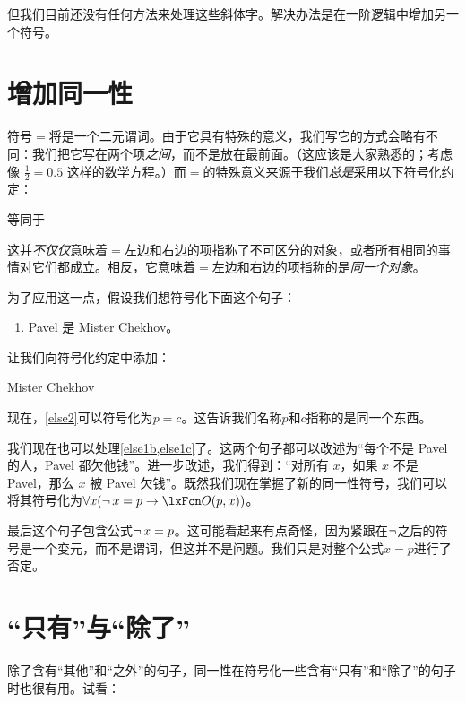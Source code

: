 但我们目前还没有任何方法来处理这些斜体字。解决办法是在一阶逻辑中增加另一个符号。

\section{增加同一性}

符号$=$将是一个二元谓词。由于它具有特殊的意义，我们写它的方式会略有不同：我们把它写在两个项\emph{之间}，而不是放在最前面。（这应该是大家熟悉的；考虑像 $\frac{1}{2} = 0.5$ 这样的数学方程。）而$=$的特殊意义来源于我们\emph{总是}采用以下符号化约定：

\begin{ekey}
		\item[x=y]  等同于 
	\end{ekey}

这并\emph{不仅仅}意味着$=$左边和右边的项指称了不可区分的对象，或者所有相同的事情对它们都成立。相反，它意味着$=$左边和右边的项指称的是\emph{同一个对象}。

为了应用这一点，假设我们想符号化下面这个句子：

\begin{enumerate}
\item\label{else2} Pavel 是 Mister Chekhov。
\end{enumerate}

让我们向符号化约定中添加：

\begin{ekey}
		\item[c] Mister Chekhov
	\end{ekey}

现在，\cref*{else2}可以符号化为$p=c$。这告诉我们名称$p$和$c$指称的是同一个东西。

我们现在也可以处理\cref{else1b,else1c}了。这两个句子都可以改述为“每个不是 Pavel 的人，Pavel 都欠他钱”。进一步改述，我们得到：“对所有 $x$，如果 $x$ 不是 Pavel，那么 $x$ 被 Pavel 欠钱”。既然我们现在掌握了新的同一性符号，我们可以将其符号化为$\forall x (\enot\, {x = p} \eif \atom{O}{p,x})$。

最后这个句子包含公式$\neg\, {x = p}$。这可能看起来有点奇怪，因为紧跟在$\neg$之后的符号是一个变元，而不是谓词，但这并不是问题。我们只是对整个公式$x = p$进行了否定。

\section{“只有”与“除了”}

除了含有“其他”和“之外”的句子，同一性在符号化一些含有“只有”和“除了”的句子时也很有用。试看：

